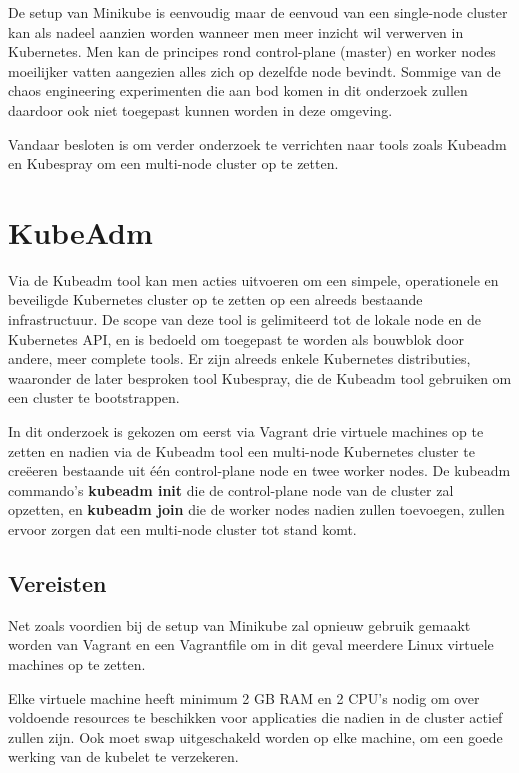 De setup van Minikube is eenvoudig maar de eenvoud van een single-node cluster kan als nadeel aanzien worden wanneer men meer inzicht wil verwerven in Kubernetes. Men kan de principes rond control-plane (master) en worker nodes moeilijker vatten aangezien alles zich op dezelfde node bevindt. Sommige van de chaos engineering experimenten die aan bod komen in dit onderzoek zullen daardoor ook niet toegepast kunnen worden in deze omgeving.

Vandaar besloten is om verder onderzoek te verrichten naar tools zoals Kubeadm en Kubespray om een multi-node cluster op te zetten.    

\section{KubeAdm}
\label{sec:kubeadm}

Via de Kubeadm tool kan men acties uitvoeren om een simpele, operationele en beveiligde Kubernetes cluster op te zetten op een alreeds bestaande infrastructuur. De scope van deze tool is gelimiteerd tot de lokale node en de Kubernetes API, en is bedoeld om toegepast te worden als bouwblok door andere, meer complete tools. \autocite{Kubeadm2021}
Er zijn alreeds enkele Kubernetes distributies, waaronder de later besproken tool Kubespray, die de Kubeadm tool gebruiken om een cluster te bootstrappen.     

In dit onderzoek is gekozen om eerst via Vagrant drie virtuele machines op te zetten  en nadien via de Kubeadm tool een multi-node Kubernetes cluster te creëeren bestaande uit één control-plane node en twee worker nodes. De kubeadm commando's {\bf kubeadm init} die de control-plane node van de cluster zal opzetten, en {\bf kubeadm join} die de worker nodes nadien zullen toevoegen, zullen ervoor zorgen dat een multi-node cluster tot stand komt.

\subsection{Vereisten}

Net zoals voordien bij de setup van Minikube zal opnieuw gebruik gemaakt worden van Vagrant en een Vagrantfile om in dit geval meerdere Linux virtuele machines op te zetten.

Elke virtuele machine heeft minimum 2 GB RAM en 2 CPU's nodig om over voldoende resources te beschikken voor applicaties die nadien in de cluster actief zullen zijn. Ook moet swap uitgeschakeld worden op elke machine, om een goede werking van de kubelet te verzekeren. \autocite{Kubernetes2022a}

